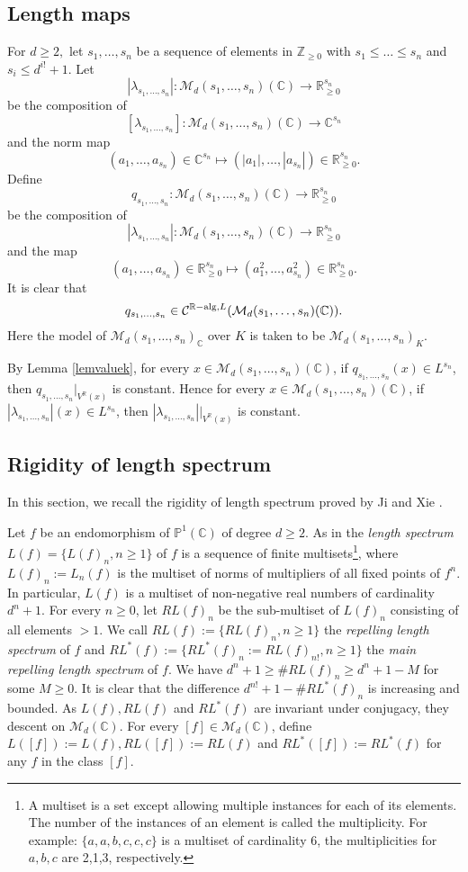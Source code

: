 \documentclass[12pt]{amsart}
\theoremstyle{plain}
\theoremstyle{remark}
\theoremstyle{definition}
\def\Z{\mathbb Z}
\def\R{\mathbb R}
\def\C{\mathbb C}
\def\sC{\mathcal C}
\def\P{\mathbb P}
\def\sM{\mathcal M}
\def\alg{{\rm alg}}
\def\la{\lambda}
\begin{document}
\subsection{Length maps}\label{sectionlengmap}
For $d\geq 2,$ let $s_1,\dots, s_n$ be a sequence of elements in $\Z_{\geq 0}$ with $s_1\leq \dots \leq s_n$ and $s_i\leq d^{i!}+1.$
Let $$|\la_{s_1,\dots,s_n}|: \sM_d(s_1,\dots, s_n)(\C)\to \R_{\geq 0}^{s_n}$$ be the composition of $$[\la_{s_1,\dots, s_n}]: \sM_d(s_1,\dots, s_n)(\C)\to \C^{s_n}$$ and the norm map $$(a_1,\dots, a_{s_n})\in \C^{s_n}\mapsto (|a_1|,\dots, |a_{s_n}|)\in \R_{\geq 0}^{s_n}.$$
Define $$q_{s_1,\dots, s_n}: \sM_d(s_1,\dots, s_n)(\C)\to \R_{\geq 0}^{s_n}$$ be the composition of 
$$|\la_{s_1,\dots,s_n}|: \sM_d(s_1,\dots, s_n)(\C)\to \R_{\geq 0}^{s_n}$$
 and the map $$(a_1,\dots, a_{s_n})\in \R_{\geq 0}^{s_n} \mapsto (a_1^2,\dots, a_{s_n}^2)\in \R_{\geq 0}^{s_n}.$$
It is clear that $$q_{s_1,\dots, s_n}\in \sC^{\R-\alg,L}(\sM_d(s_1,\dots, s_n)(\C)).$$ Here the model of $\sM_d(s_1,\dots, s_n)_{\C}$ over $K$ is taken to be $\sM_d(s_1,\dots, s_n)_{K}.$

\medskip

By Lemma \ref{lemvaluek}, for every $x\in \sM_d(s_1,\dots, s_n)(\C)$, if $q_{s_1,\dots, s_n}(x)\in L^{s_n}$, then $q_{s_1,\dots, s_n}|_{V^{\R}(x)}$ is constant. 
Hence for every $x\in \sM_d(s_1,\dots, s_n)(\C)$, if $|\la_{s_1,\dots,s_n}|(x)\in L^{s_n}$, then $|\la_{s_1,\dots,s_n}||_{V^{\R}(x)}$ is constant. 

\subsection{Rigidity of length spectrum}
In this section, we recall the rigidity of length spectrum proved by Ji and Xie \cite{Ji2023}.


Let $f$ be an endomorphism of $\P^1(\C)$ of degree $d\geq 2$.
As in \cite[Section 8.3]{Ji2023} the \emph{length spectrum} $L(f)=\{L(f)_n, n\geq 1\}$ of $f$ is a sequence of finite multisets\footnote{A multiset is a set except allowing multiple instances for each of its elements. The number of the instances of an element is called the multiplicity. For example: $\{a,a,b,c,c,c\}$ is a multiset of cardinality $6$, the multiplicities for $a,b,c$ are 2,1,3, respectively.}, where $L(f)_n:=L_n(f)$ is the multiset of 
norms of multipliers of all fixed points of $f^n.$
In particular, $L(f)$ is a multiset of non-negative real numbers of cardinality $d^n+1$. 
For every $n\geq 0$, let $RL(f)_n$ be the sub-multiset of $L(f)_n$ consisting of all elements $>1.$
We call $RL(f):= \{RL(f)_n, n\geq 1\}$ the \emph{repelling length spectrum} of $f$ and 
$RL^*(f):= \{RL^*(f)_n:=RL(f)_{n!}, n\geq 1\}$ the \emph{main repelling length spectrum} of $f$.  We have $d^{n}+1\geq\# RL(f)_n\geq d^{n}+1-M$ for some $M\geq 0$.
It is clear that the difference  $d^{n!}+1-\# RL^*(f)_n$ is increasing and bounded.
As $L(f), RL(f)$ and $RL^*(f)$ are invariant under conjugacy, they descent on $\sM_d(\C)$.
For every $[f]\in \sM_d(\C)$, define $L([f]):=L(f), RL([f]):=RL(f)$ and $RL^*([f]):=RL^*(f)$ for any  $f$ in the class $[f]$.
\end{document}
